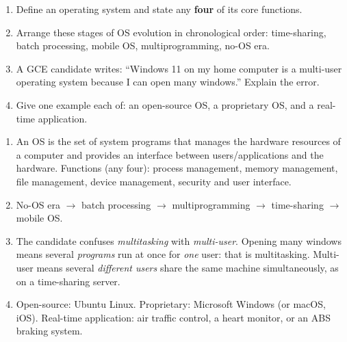 \documentclass[11pt]{article}
\begin{document}
\begin{exercice}
\begin{enumerate}
\item Define an operating system and state any \textbf{four} of its core functions.
\item Arrange these stages of OS evolution in chronological order: time-sharing, batch processing, mobile OS, multiprogramming, no-OS era.
\item A GCE candidate writes: ``Windows 11 on my home computer is a multi-user operating system because I can open many windows.'' Explain the error.
\item Give one example each of: an open-source OS, a proprietary OS, and a real-time application.
\end{enumerate}
\end{exercice}

\begin{corrige}
\begin{enumerate}
\item An OS is the set of system programs that manages the hardware resources of a computer and provides an interface between users/applications and the hardware. Functions (any four): process management, memory management, file management, device management, security and user interface.
\item No-OS era $\rightarrow$ batch processing $\rightarrow$ multiprogramming $\rightarrow$ time-sharing $\rightarrow$ mobile OS.
\item The candidate confuses \emph{multitasking} with \emph{multi-user}. Opening many windows means several \emph{programs} run at once for \emph{one} user: that is multitasking. Multi-user means several \emph{different users} share the same machine simultaneously, as on a time-sharing server.
\item Open-source: Ubuntu Linux. Proprietary: Microsoft Windows (or macOS, iOS). Real-time application: air traffic control, a heart monitor, or an ABS braking system.
\end{enumerate}
\end{corrige}
\end{document}

